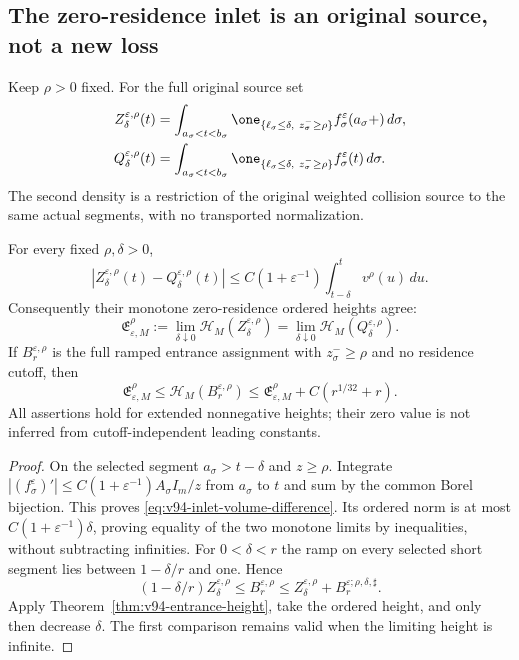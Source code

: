 \subsection{The zero-residence inlet is an original source, not a new loss}
Keep $\rho>0$ fixed. For the full original source set
\begin{align}
 Z_\delta^{\varepsilon,\rho}(t)
 &=\int_{a_\sigma<t<b_\sigma}
       \one_{\{\ell_\sigma\le\delta,\ z_\sigma^-\ge\rho\}}
                         f_\sigma^\varepsilon(a_\sigma+)\,d\sigma,\notag\\
 Q_\delta^{\varepsilon,\rho}(t)
 &=\int_{a_\sigma<t<b_\sigma}
       \one_{\{\ell_\sigma\le\delta,\ z_\sigma^-\ge\rho\}}
                         f_\sigma^\varepsilon(t)\,d\sigma.
                                             \label{eq:v94-inlet-volume}
\end{align}
The second density is a restriction of the original weighted collision
source to the same actual segments, with no transported normalization.

\begin{proposition}
\label{prop:v94-inlet-charge}
For every fixed $\rho,\delta>0$,
\begin{equation}\label{eq:v94-inlet-volume-difference}
 |Z_\delta^{\varepsilon,\rho}(t)-Q_\delta^{\varepsilon,\rho}(t)|
 \le C(1+\varepsilon^{-1})\int_{t-\delta}^{t}v^\rho(u)\,du.
\end{equation}
Consequently their monotone zero-residence ordered heights agree:
\[
 \mathfrak E_{\varepsilon,M}^{\rho}
 :=\lim_{\delta\downarrow0}\mathcal H_M(Z_\delta^{\varepsilon,\rho})
  =\lim_{\delta\downarrow0}\mathcal H_M(Q_\delta^{\varepsilon,\rho}).
\]
If $B_r^{\varepsilon,\rho}$ is the full ramped entrance assignment
with $z_\sigma^-\ge\rho$ and no residence cutoff, then
\begin{equation}\label{eq:v94-inlet-sandwich}
 \mathfrak E_{\varepsilon,M}^{\rho}
 \le\mathcal H_M(B_r^{\varepsilon,\rho})
 \le\mathfrak E_{\varepsilon,M}^{\rho}+C(r^{1/32}+r).
\end{equation}
All assertions hold for extended nonnegative heights; their zero value
is not inferred from cutoff-independent leading constants.
\end{proposition}
\begin{proof}
On the selected segment $a_\sigma>t-\delta$ and $z\ge\rho$.
Integrate
$|(f_\sigma^\varepsilon)'|\le
 C(1+\varepsilon^{-1})A_\sigma I_m/z$
from $a_\sigma$ to $t$ and sum by the common Borel bijection.
This proves \eqref{eq:v94-inlet-volume-difference}. Its ordered norm
is at most $C(1+\varepsilon^{-1})\delta$, proving equality of the
two monotone limits by inequalities, without subtracting infinities.
For $0<\delta<r$ the ramp on every selected short segment lies between
$1-\delta/r$ and one. Hence
\[
 (1-\delta/r)Z_\delta^{\varepsilon,\rho}
 \le B_r^{\varepsilon,\rho}
 \le Z_\delta^{\varepsilon,\rho}
                   +B_r^{\varepsilon;\rho,\delta,\sharp}.
\]
Apply Theorem~\ref{thm:v94-entrance-height}, take the ordered height,
and only then decrease $\delta$. The first comparison remains valid
when the limiting height is infinite.
\end{proof}
